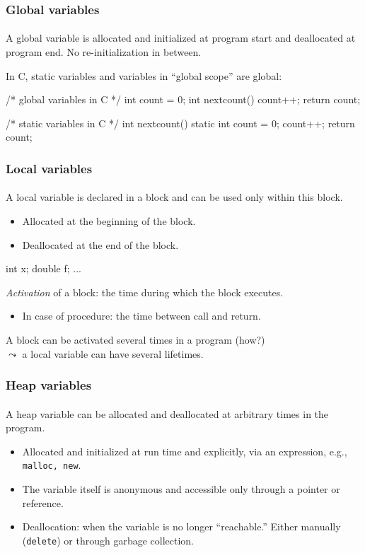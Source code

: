 \documentclass{beamer}
\begin{document}
\begin{frame}[fragile]
\frametitle{Global variables}
\framesubtitle{}
A global variable is allocated and initialized at program start and deallocated
at program end. No re-initialization in between.

\bigskip
In C, static variables and variables in ``global scope''  are global:
\begin{cplus3}
/* global variables in C */
int count = 0;
int nextcount() {
    count++;
    return count;
}

/* static variables in C */
int nextcount() {
    static int count = 0;
    count++;
    return count;
}
\end{cplus3}
\end{frame}


\begin{frame}[fragile]
\frametitle{Local variables}
\framesubtitle{}
A local variable is declared in a block and can be used only
within this block.
\begin{itemize}
\item Allocated at the beginning of the block.
\item Deallocated at the end of the block.
\end{itemize}

\begin{cplus3}
   { 
       int x;
       double f;
       ...

   }
\end{cplus3}
\bigskip

\textit{Activation} of a block: the time during which the block executes.
\begin{itemize}
\item In case of procedure: the time between call and return.
\end{itemize}
A block can be activated several times in a program (how?)\\  $\leadsto$
a local variable can have several lifetimes.  
\end{frame}

\begin{frame}[fragile]
\frametitle{Heap variables}
\framesubtitle{}
A heap variable can be allocated and deallocated at arbitrary times in
the program.
\begin{itemize}
\item Allocated and initialized at run time and explicitly, 
via an expression, e.g., \texttt{malloc, new}.
\item The variable itself is anonymous and accessible only through 
 a pointer or reference. 
\item Deallocation: when the variable is no longer ``reachable.''
Either manually (\texttt{delete}) or through garbage collection. 
\end{itemize}
\end{frame}
\end{document}
